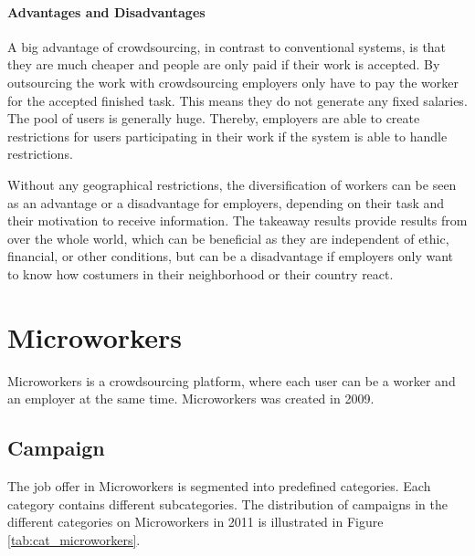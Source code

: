 \paragraph{Advantages and Disadvantages}
A big advantage of crowdsourcing, in contrast to conventional systems, is that they are much cheaper and people are only paid if their work is accepted. By outsourcing the work with crowdsourcing employers only have to pay the worker for the accepted finished task. This means they do not generate any fixed salaries. 
The pool of users is generally huge. Thereby, employers are able to create restrictions for users participating in their work if the system is able to handle restrictions.

Without any geographical restrictions, the diversification of workers can be seen as an advantage or a disadvantage for employers, depending on their task and their motivation to receive information. The takeaway results provide results from over the whole world, which can be beneficial as they are independent of ethic, financial, or other conditions, but can be a disadvantage if employers only want to know how costumers in their neighborhood or their country react.



\section{Microworkers}

Microworkers \cite{Microworkers} is a crowdsourcing platform, where each user can be a worker and an employer at the same time. Microworkers was created in 2009.

\subsection{Campaign}
The job offer in Microworkers is segmented into predefined categories. Each category contains different subcategories.
The distribution of campaigns in the different categories on Microworkers in 2011 is illustrated in Figure \ref{tab:cat_microworkers}.

